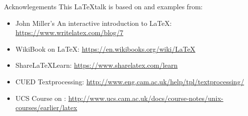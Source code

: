 \documentclass[10pt,times]{beamer}
\begin{document}
\begin{frame}{Acknowlegements}
This \LaTeX talk is based on and examples from:
\begin{itemize}
\item John Miller's An interactive introduction to \LaTeX: 
\href{https://www.writelatex.com/blog/7}{https://www.writelatex.com/blog/7}
\item WikiBook on \LaTeX: 
\href{https://en.wikibooks.org/wiki/LaTeX}{https://en.wikibooks.org/wiki/LaTeX}
\item Share\LaTeX Learn: 
\href{https://www.sharelatex.com/learn}{https://www.sharelatex.com/learn}
\item CUED Textprocessing: \href{http://www.eng.cam.ac.uk/help/tpl/textprocessing/}{http://www.eng.cam.ac.uk/help/tpl/textprocessing/}
\item UCS Course on \LaTeXe: \href{http://www.ucs.cam.ac.uk/docs/course-notes/unix-courses/earlier/latex}{http://www.ucs.cam.ac.uk/docs/course-notes/unix-courses/earlier/latex}
\end{itemize}
\end{frame}
\end{document}
